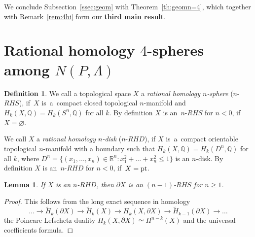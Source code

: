 \documentclass[12pt]{amsart}
\newtheorem{lemma}[formula]{Lemma}
\theoremstyle{definition}
\newtheorem{definition}[formula]{Definition}
\theoremstyle{remark}
\begin{document}
We conclude Subsection~\ref{ssec:geom}  with Theorem~\ref{th:geomn=4}, 
which together with Remark~\ref{rem:4hi} form our {\bf third main result}.
  

\section{Rational homology $4$-spheres among $N(P,\Lambda)$}\label{sec:RHS}
\begin{definition}
We call a topological space $X$ a {\it rational homology $n$-sphere} ($n$-$RHS$), 
if~$X$ is~a~compact closed topological $n$-manifold 
and $H_k(X,\mathbb Q)=H_k(S^n,\mathbb Q)$ for all $k$. By definition $X$ is an~$n$-$RHS$
for $n<0$, if $X=\varnothing$.


We call  $X$ a {\it rational homology $n$-disk} ($n$-$RHD$), if $X$ 
is~a~compact orientable topological $n$-manifold with a boundary 
such that $H_k(X,\mathbb Q)=H_k(D^n,\mathbb Q)$ for all $k$, where 
$D^n=\{(x_1,\dots, x_n)\in\mathbb R^n\colon x_1^2+\dots+x_n^2\leqslant 1\}$ is an $n$-disk.
By definition $X$ is an~$n$-$RHD$
for $n<0$, if~$X={\rm pt}$.

\end{definition} 
\begin{lemma}\label{lem:DS}
If $X$ is an $n$-$RHD$, then $\partial X$ is an $(n-1)$-$RHS$ for $n\geqslant 1$.
\end{lemma}
\begin{proof}
This follows from the long exact sequence in homology 
$$
\dots\to \widetilde{H}_k(\partial X)\to \widetilde{H}_k(X)\to H_k(X,\partial X)\to \widetilde{H}_{k-1}(\partial X)\to \dots
$$
the Poincare-Lefschetz duality $H_k(X,\partial X)\simeq H^{n-k}(X)$ and the universal coefficients
formula.
\end{proof}
 
\end{document}
